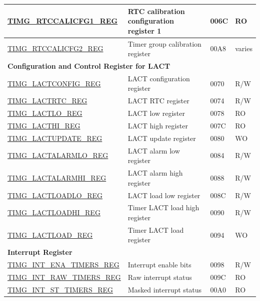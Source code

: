 \begin{longtable}{ | p{6cm} | p{7.2cm} | p{1.3cm} | p{1cm} | }
\hyperref[regdesc:TIMGRTCCALICFG1REG]{TIMG\_RTCCALICFG1\_REG} & RTC calibration configuration register 1 & \hexprefix{}006C & RO \\ \hline
\hyperref[regdesc:TIMGRTCCALICFG2REG]{TIMG\_RTCCALICFG2\_REG} & Timer group calibration register & \hexprefix{}00A8 & varies \\ \hline
\multicolumn{4}{|l|}{\textbf{Configuration and Control Register for LACT}} \\ \hline
\hyperref[regdesc:TIMGLACTCONFIGREG]{TIMG\_LACTCONFIG\_REG} & LACT configuration register & \hexprefix{}0070 & R/W \\ \hline
\hyperref[regdesc:TIMGLACTRTCREG]{TIMG\_LACTRTC\_REG} & LACT RTC register & \hexprefix{}0074 & R/W \\ \hline
\hyperref[regdesc:TIMGLACTLOREG]{TIMG\_LACTLO\_REG} & LACT low register & \hexprefix{}0078 & RO \\ \hline
\hyperref[regdesc:TIMGLACTHIREG]{TIMG\_LACTHI\_REG} & LACT high register & \hexprefix{}007C & RO \\ \hline
\hyperref[regdesc:TIMGLACTUPDATEREG]{TIMG\_LACTUPDATE\_REG} & LACT update register & \hexprefix{}0080 & WO \\ \hline
\hyperref[regdesc:TIMGLACTALARMLOREG]{TIMG\_LACTALARMLO\_REG} & LACT alarm low register & \hexprefix{}0084 & R/W \\ \hline
\hyperref[regdesc:TIMGLACTALARMHIREG]{TIMG\_LACTALARMHI\_REG} & LACT alarm high register & \hexprefix{}0088 & R/W \\ \hline
\hyperref[regdesc:TIMGLACTLOADLOREG]{TIMG\_LACTLOADLO\_REG} & LACT load low register & \hexprefix{}008C & R/W \\ \hline
\hyperref[regdesc:TIMGLACTLOADHIREG]{TIMG\_LACTLOADHI\_REG} & Timer LACT load high register & \hexprefix{}0090 & R/W \\ \hline
\hyperref[regdesc:TIMGLACTLOADREG]{TIMG\_LACTLOAD\_REG} & Timer LACT load register & \hexprefix{}0094 & WO \\ \hline
\multicolumn{4}{|l|}{\textbf{Interrupt Register}} \\ \hline
\hyperref[regdesc:TIMGINTENATIMERSREG]{TIMG\_INT\_ENA\_TIMERS\_REG} & Interrupt enable bits & \hexprefix{}0098 & R/W \\ \hline
\hyperref[regdesc:TIMGINTRAWTIMERSREG]{TIMG\_INT\_RAW\_TIMERS\_REG} & Raw interrupt status & \hexprefix{}009C & RO \\ \hline
\hyperref[regdesc:TIMGINTSTTIMERSREG]{TIMG\_INT\_ST\_TIMERS\_REG} & Masked interrupt status & \hexprefix{}00A0 & RO \\ \hline

\end{longtable}
